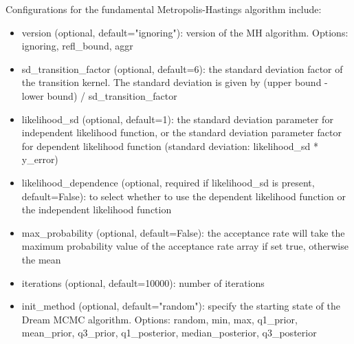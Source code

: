 Configurations for the fundamental Metropolis-Hastings algorithm include:
\begin{itemize}
    \item version (optional, default="ignoring"): version of the MH algorithm. Options: ignoring, refl\_bound, aggr
    \item sd\_transition\_factor (optional, default=6): the standard deviation factor of the transition kernel. The standard deviation is given by (upper bound - lower bound) / sd\_transition\_factor
    \item likelihood\_sd (optional, default=1): the standard deviation parameter for independent likelihood function, or the standard deviation parameter factor for dependent likelihood function (standard deviation: likelihood\_sd * y\_error)
    \item likelihood\_dependence (optional, required if likelihood\_sd is present, default=False): to select whether to use the dependent likelihood function or the independent likelihood function
    \item max\_probability (optional, default=False): the acceptance rate will take the maximum probability value of the acceptance rate array if set true, otherwise the mean
    \item iterations (optional, default=10000): number of iterations
    \item init\_method (optional, default="random"): specify the starting state of the Dream MCMC algorithm. Options: random, min, max, q1\_prior, mean\_prior, q3\_prior, q1\_posterior, median\_posterior, q3\_posterior
\end{itemize}

